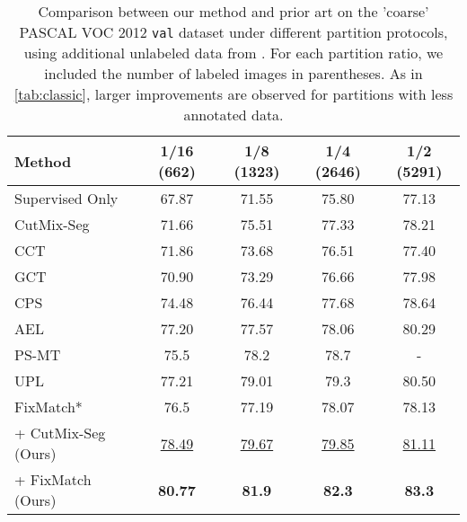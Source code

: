 \documentclass{article}
\renewcommand{\cite}[1]{\citep{#1}}
\begin{document}
\begin{table}\centering
\caption{
Comparison between our method and prior art on the 'coarse' PASCAL VOC 2012 \texttt{val} dataset under different partition protocols, using additional unlabeled data from \cite{sbd}.
For each partition ratio, we included the number of labeled images in parentheses. As in \cref{tab:classic}, larger improvements are observed for partitions with less annotated data.
}
\label{tab:blender_fix}
\begin{tabular}{lcccc}
\toprule
\textbf{Method} & 
\textbf{1/16 (662)} & \textbf{1/8 (1323)} & \textbf{1/4 (2646)} & \textbf{1/2 (5291)} \\
\midrule
Supervised Only & 
67.87 & 71.55 & 75.80 & 77.13 \\
\midrule
CutMix-Seg \cite{french2019semi}& 
71.66 & 75.51 & 77.33 & 78.21  \\
CCT \cite{cct} & 
71.86 & 73.68 & 76.51 & 77.40 \\
GCT \cite{gct} &
70.90 & 73.29 & 76.66 & 77.98 \\
CPS \cite{cps} & 
74.48 & 76.44 & 77.68 & 78.64\\
AEL \cite{ael} & 
77.20 & 77.57 & 78.06 & 80.29\\
PS-MT \cite{psmt} &
75.5 & 78.2 & 78.7 & -\\
UPL \cite{wang2022semi} &
77.21 & 79.01 & 79.3 & 80.50\\
FixMatch* \cite{Rabadan2022DenseFA}  &
76.5 &  77.19  & 78.07  & 78.13 \\
\midrule
\methodname{} + CutMix-Seg (Ours) &
\underline{78.49}  &
\underline{79.67}  &
\underline{79.85}  & 
\underline{81.11} \\

\methodname{} + FixMatch (Ours) &
\textbf{80.77} & \textbf{81.9} & \textbf{82.3} & \textbf{83.3} \\ 
\bottomrule
\end{tabular}
\end{table}
\end{document}
